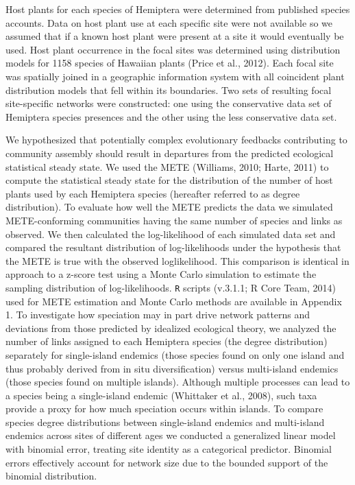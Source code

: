 Host plants for each species of Hemiptera were determined from
published species accounts. Data on host plant use at each specific
site were not available so we assumed that if a known host plant were
present at a site it would eventually be used. Host plant occurrence
in the focal sites was determined using distribution models for 1158
species of Hawaiian plants (Price et al., 2012). Each focal site was
spatially joined in a geographic information system with all
coincident plant distribution models that fell within its
boundaries. Two sets of resulting focal site-specific networks were
constructed: one using the conservative data set of Hemiptera species
presences and the other using the less conservative data set.

We hypothesized that potentially complex evolutionary feedbacks
contributing to community assembly should result in departures from
the predicted ecological statistical steady state. We used the METE
(Williams, 2010; Harte, 2011) to compute the statistical steady state
for the distribution of the number of host plants used by each
Hemiptera species (hereafter referred to as degree distribution). To
evaluate how well the METE predicts the data we simulated
METE-conforming communities having the same number of species and
links as observed. We then calculated the log-likelihood of each
simulated data set and compared the resultant distribution of
log-likelihoods under the hypothesis that the METE is true with the
observed loglikelihood. This comparison is identical in approach to a
z-score test using a Monte Carlo simulation to estimate the sampling
distribution of log-likelihoods. \texttt{R} scripts (v.3.1.1; R Core Team,
2014) used for METE estimation and Monte Carlo methods are available
in Appendix 1.  To investigate how speciation may in part drive
network patterns and deviations from those predicted by idealized
ecological theory, we analyzed the number of links assigned to each
Hemiptera species (the degree distribution) separately for
single-island endemics (those species found on only one island and
thus probably derived from in situ diversification) versus
multi-island endemics (those species found on multiple
islands). Although multiple processes can lead to a species being a
single-island endemic (Whittaker et al., 2008), such taxa provide a
proxy for how much speciation occurs within islands. To compare
species degree distributions between single-island endemics and
multi-island endemics across sites of different ages we conducted a
generalized linear model with binomial error, treating site identity
as a categorical predictor. Binomial errors effectively account for
network size due to the bounded support of the binomial distribution.

